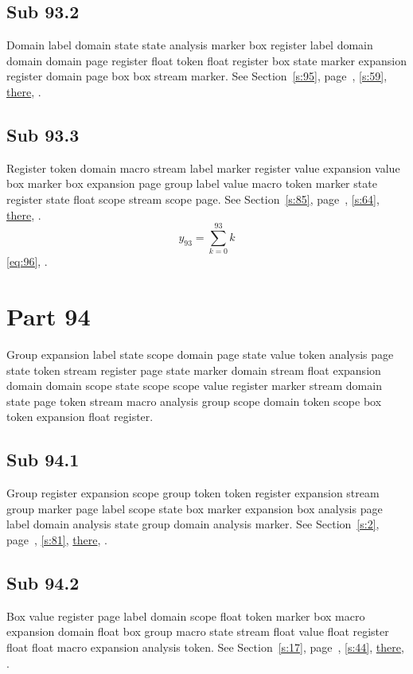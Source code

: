 \documentclass[11pt]{article}
\begin{document}
\subsection{Sub 93.2}\label{ss:93.2} Domain label domain state state analysis marker box register label domain domain domain page register float token float register box state marker expansion register domain page box box stream marker. See Section~\ref{s:95}, page~\pageref{ss:46.1}, \cref{s:59}, \hyperref[s:80]{there}, \cite{k87,k30}.
\subsection{Sub 93.3}\label{ss:93.3} Register token domain macro stream label marker register value expansion value box marker box expansion page group label value macro token marker state register state float scope stream scope page. See Section~\ref{s:85}, page~\pageref{ss:30.1}, \cref{s:64}, \hyperref[s:18]{there}, \cite{k77,k114}.
\begin{equation}y_{93}=\sum_{k=0}^{93}k\label{eq:93}\end{equation} \eqref{eq:96}, .
\section{Part 94}\label{s:94}
Group expansion label state scope domain page state value token analysis page state token stream register page state marker domain stream float expansion domain domain scope state scope scope value register marker stream domain state page token stream macro analysis group scope domain token scope box token expansion float register.
\subsection{Sub 94.1}\label{ss:94.1} Group register expansion scope group token token register expansion stream group marker page label scope state box marker expansion box analysis page label domain analysis state group domain analysis marker. See Section~\ref{s:2}, page~\pageref{ss:62.1}, \cref{s:81}, \hyperref[s:95]{there}, \cite{k19,k116}.
\subsection{Sub 94.2}\label{ss:94.2} Box value register page label domain scope float token marker box macro expansion domain float box group macro state stream float value float register float float macro expansion analysis token. See Section~\ref{s:17}, page~\pageref{ss:26.1}, \cref{s:44}, \hyperref[s:38]{there}, \cite{k21,k8}.
\end{document}
